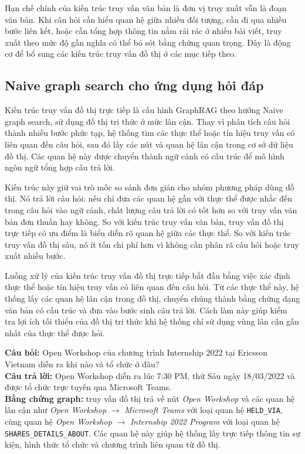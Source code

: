 Hạn chế chính của kiến trúc truy vấn văn bản là đơn vị truy xuất vẫn là đoạn văn bản. Khi câu hỏi cần hiểu quan hệ giữa nhiều đối tượng, cần đi qua nhiều bước liên kết, hoặc cần tổng hợp thông tin nằm rải rác ở nhiều bài viết, truy xuất theo mức độ gần nghĩa có thể bỏ sót bằng chứng quan trọng. Đây là động cơ để bổ sung các kiến trúc truy vấn đồ thị ở các mục tiếp theo.

\subsection{Naive graph search cho ứng dụng hỏi đáp}

Kiến trúc truy vấn đồ thị trực tiếp là cấu hình GraphRAG theo hướng Naive graph search, sử dụng đồ thị tri thức ở mức lân cận. Thay vì phân tích câu hỏi thành nhiều bước phức tạp, hệ thống tìm các thực thể hoặc tín hiệu truy vấn có liên quan đến câu hỏi, sau đó lấy các nút và quan hệ lân cận trong cơ sở dữ liệu đồ thị. Các quan hệ này được chuyển thành ngữ cảnh có cấu trúc để mô hình ngôn ngữ tổng hợp câu trả lời.

Kiến trúc này giữ vai trò mốc so sánh đơn giản cho nhóm phương pháp dùng đồ thị. Nó trả lời câu hỏi: nếu chỉ đưa các quan hệ gần với thực thể được nhắc đến trong câu hỏi vào ngữ cảnh, chất lượng câu trả lời có tốt hơn so với truy vấn văn bản đơn thuần hay không. So với kiến trúc truy vấn văn bản, truy vấn đồ thị trực tiếp có ưu điểm là biểu diễn rõ quan hệ giữa các thực thể. So với kiến trúc truy vấn đồ thị sâu, nó ít tốn chi phí hơn vì không cần phân rã câu hỏi hoặc truy xuất nhiều bước.

Luồng xử lý của kiến trúc truy vấn đồ thị trực tiếp bắt đầu bằng việc xác định thực thể hoặc tín hiệu truy vấn có liên quan đến câu hỏi. Từ các thực thể này, hệ thống lấy các quan hệ lân cận trong đồ thị, chuyển chúng thành bằng chứng dạng văn bản có cấu trúc và đưa vào bước sinh câu trả lời. Cách làm này giúp kiểm tra lợi ích tối thiểu của đồ thị tri thức khi hệ thống chỉ sử dụng vùng lân cận gần nhất của thực thể được hỏi.

\begin{tcolorbox}[
    enhanced,
    breakable,
    title={Ví dụ minh họa -- Naive graph search},
    fonttitle=\bfseries,
    colback=green!2,
    colframe=darkblue!70,
    boxrule=0.5pt,
    arc=1.5mm,
    left=6pt,
    right=6pt,
    top=5pt,
    bottom=5pt
]
\small
\textbf{Câu hỏi:} Open Workshop của chương trình Internship 2022 tại Ericsson Vietnam diễn ra khi nào và tổ chức ở đâu?\\
\textbf{Câu trả lời:} Open Workshop diễn ra lúc 7:30 PM, thứ Sáu ngày 18/03/2022 và được tổ chức trực tuyến qua Microsoft Teams.\\
\textbf{Bằng chứng graph:} truy vấn đồ thị trả về nút \textit{Open Workshop} và các quan hệ lân cận như \textit{Open Workshop} $\rightarrow$ \textit{Microsoft Teams} với loại quan hệ \texttt{HELD\_VIA}, cùng quan hệ \textit{Open Workshop} $\rightarrow$ \textit{Internship 2022 Program} với loại quan hệ \texttt{SHARES\_DETAILS\_ABOUT}. Các quan hệ này giúp hệ thống lấy trực tiếp thông tin sự kiện, hình thức tổ chức và chương trình liên quan từ đồ thị.\\
\end{tcolorbox}


